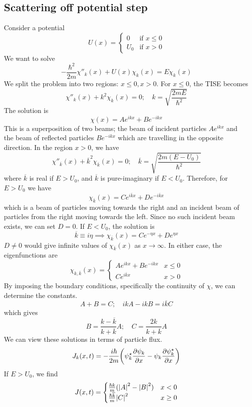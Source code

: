 \subsection{Scattering off potential step}
Consider a potential
\[
	U(x) =
	\begin{cases}
		0   & \text{if } x \leq 0 \\
		U_0 & \text{if } x > 0
	\end{cases}
\]
We want to solve
\[
	-\frac{\hbar^2}{2m} \chi''_k(x) + U(x) \chi_k(x) = E\chi_k(x)
\]
We split the problem into two regions: \( x \leq 0, x > 0 \).
For \( x \leq 0 \), the TISE becomes
\[
	\chi''_k(x) + k^2 \chi_k(x) = 0;\quad k = \sqrt{\frac{2mE}{\hbar^2}}
\]
The solution is
\[
	\chi(x) = Ae^{ikx} + Be^{-ikx}
\]
This is a superposition of two beams; the beam of incident particles \( Ae^{ikx} \) and the beam of reflected particles \( Be^{-ikx} \) which are travelling in the opposite direction.
In the region \( x > 0 \), we have
\[
	\chi''_{\overline k}(x) + \overline k^2 \chi_{\overline k}(x) = 0;\quad \overline k = \sqrt{\frac{2m(E-U_0)}{\hbar^2}}
\]
where \( \overline k \) is real if \( E > U_0 \), and \( \overline k \) is pure-imaginary if \( E < U_0 \).
Therefore, for \( E > U_0 \) we have
\[
	\chi_{\overline k}(x) = Ce^{i \overline k x} + De^{-i \overline k x}
\]
which is a beam of particles moving towards the right and an incident beam of particles from the right moving towards the left.
Since no such incident beam exists, we can set \( D = 0 \).
If \( E < U_0 \), the solution is
\[
	\overline k \equiv i \eta \implies \chi_{\overline k}(x) = Ce^{-\eta x} + De^{\eta x}
\]
\( D \neq 0 \) would give infinite values of \( \chi_{\overline k}(x) \) as \( x \to \infty \).
In either case, the eigenfunctions are
\[
	\chi_{k, \overline k}(x) =
	\begin{cases}
		Ae^{ikx} + Be^{-ikx} & x \leq 0 \\
		Ce^{i \overline k x} & x > 0
	\end{cases}
\]
By imposing the boundary conditions, specifically the continuity of \( \chi \), we can determine the constants.
\[
	A + B = C;\quad ikA - ikB = i\overline k C
\]
which gives
\[
	B = \frac{k - \overline k}{k + \overline k} A;\quad C = \frac{2k}{k + \overline k}A
\]
We can view these solutions in terms of particle flux.
\[
	J_k(x,t) = - \frac{i\hbar}{2m} \qty(\psi^\star_k \pdv{\psi_k}{x} - \psi_k \pdv{\psi_k^\star}{x})
\]
If \( E > U_0 \), we find
\[
	J(x,t) =
	\begin{cases}
		\frac{\hbar k}{m} (\abs{A}^2 - \abs{B}^2) & x < 0    \\
		\frac{\hbar \overline k}{m} \abs{C}^2     & x \geq 0
	\end{cases}
\]

